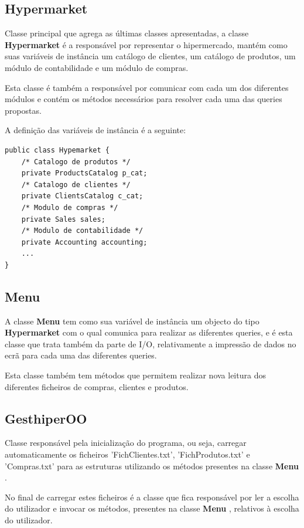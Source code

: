 \documentclass[10pt] {article}
\begin{document}
\subsection{Hypermarket}
\par Classe principal que agrega as últimas classes apresentadas, a classe \color{blue} \textbf{Hypermarket} \color{black} 
é a responsável por representar o hipermercado, mantém como suas variáveis de instância um catálogo de clientes, 
um catálogo de produtos, um módulo de contabilidade e um módulo de compras.
\par Esta classe é também a responsável por comunicar com cada um dos diferentes módulos e contém os métodos 
necessários para resolver cada uma das queries propostas.
\par A definição das variáveis de instância é a seguinte:

\begin{lstlisting}
public class Hypemarket {
	/* Catalogo de produtos */
	private ProductsCatalog p_cat;
	/* Catalogo de clientes */
	private ClientsCatalog c_cat;
	/* Modulo de compras */
	private Sales sales;
	/* Modulo de contabilidade */
	private Accounting accounting;
	...
}
\end{lstlisting}

\subsection{Menu}
\par A classe \color{blue} \textbf{Menu} \color{black} tem como sua variável de instância um objecto do tipo
\color{blue} \textbf{Hypermarket} \color{black} com o qual comunica para realizar as diferentes queries, e é esta classe que trata 
também da parte de I/O, relativamente a impressão de dados no ecrã para cada uma das diferentes queries.
\par Esta classe também tem métodos que permitem realizar nova leitura dos diferentes ficheiros de compras, clientes e
produtos.

\subsection{GesthiperOO}
\par Classe responsável pela inicialização do programa, ou seja, carregar automaticamente os ficheiros 'FichClientes.txt', 
'FichProdutos.txt' e 'Compras.txt' para as estruturas utilizando os métodos presentes na classe 
\color{blue} \textbf{Menu} \color{black}. 
\par No final de carregar estes ficheiros é a classe que fica responsável por ler a escolha do utilizador e invocar os métodos, 
presentes na classe \color{blue} \textbf{Menu} \color{black}, relativos à escolha do utilizador.
\end{document}
